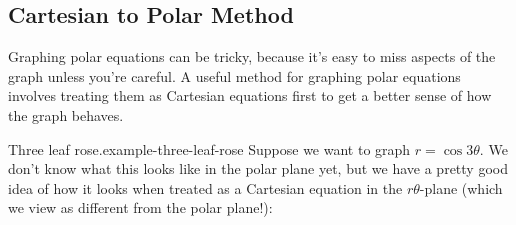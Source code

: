 \documentclass[10pt,]{book}
\numberwithin{equation}{section}
\begin{document}
\subsection[{Cartesian to Polar Method}]{Cartesian to Polar Method}\label{subsection-cartesian-to-polar-method}
\hypertarget{p-1032}{}%
Graphing polar equations can be tricky, because it's easy to miss aspects of the graph unless you're careful. A useful method for graphing polar equations involves treating them as Cartesian equations first to get a better sense of how the graph behaves.%
\begin{example}{Three leaf rose.}{example-three-leaf-rose}%
\hypertarget{p-1033}{}%
Suppose we want to graph \(r = \cos3\theta\). We don't know what this looks like in the polar plane yet, but we have a pretty good idea of how it looks when treated as a Cartesian equation in the \(r\theta\)-plane (which we view as different from the polar plane!):%
\begin{figure}
\centering
{
}
\end{figure}
\end{example}
\end{document}
